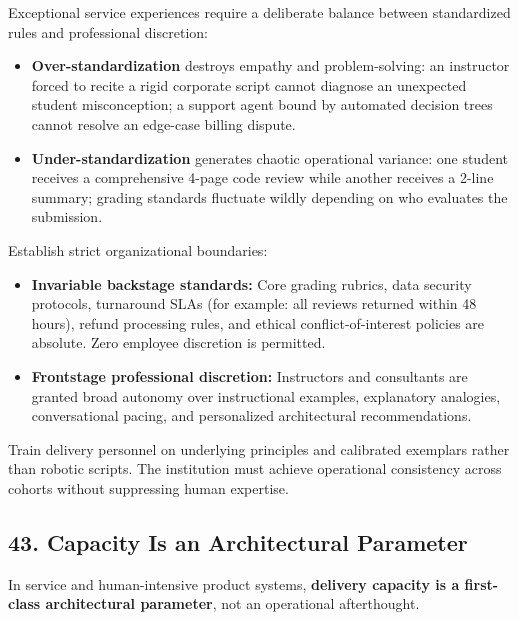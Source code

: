Exceptional service experiences require a deliberate balance between standardized rules and professional discretion:
\begin{itemize}
    \item \textbf{Over-standardization} destroys empathy and problem-solving: an instructor forced to recite a rigid corporate script cannot diagnose an unexpected student misconception; a support agent bound by automated decision trees cannot resolve an edge-case billing dispute.
    \item \textbf{Under-standardization} generates chaotic operational variance: one student receives a comprehensive 4-page code review while another receives a 2-line summary; grading standards fluctuate wildly depending on who evaluates the submission.
\end{itemize}

Establish strict organizational boundaries:
\begin{itemize}
    \item \textbf{Invariable backstage standards:} Core grading rubrics, data security protocols, turnaround SLAs (for example: all reviews returned within 48 hours), refund processing rules, and ethical conflict-of-interest policies are absolute. Zero employee discretion is permitted.
    \item \textbf{Frontstage professional discretion:} Instructors and consultants are granted broad autonomy over instructional examples, explanatory analogies, conversational pacing, and personalized architectural recommendations.
\end{itemize}

Train delivery personnel on underlying principles and calibrated exemplars rather than robotic scripts. The institution must achieve operational consistency across cohorts without suppressing human expertise.

\subsection*{43. Capacity Is an Architectural Parameter}

In service and human-intensive product systems, \textbf{delivery capacity is a first-class architectural parameter}, not an operational afterthought.

